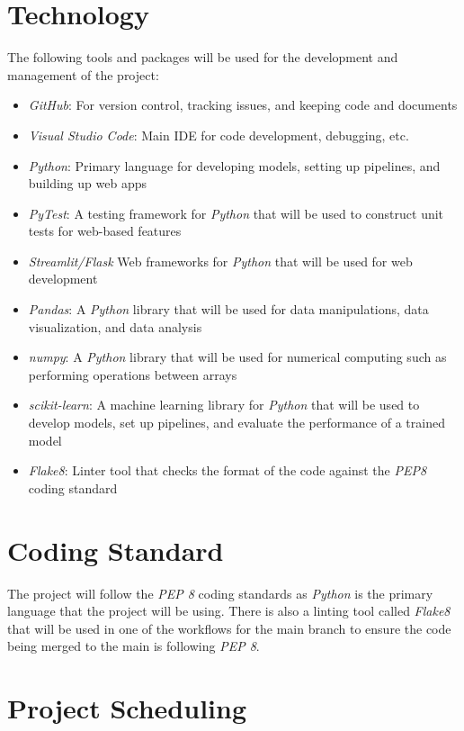 \documentclass{article}
\begin{document}
\section{Technology}
The following tools and packages will be used for the development and management of the project: 
\begin{itemize}
    \item \textit{GitHub}: For version control, tracking issues, and keeping code and documents
    \item \textit{Visual Studio Code}: Main IDE for code development, debugging,  etc.
    \item \textit{Python}: Primary language for developing models, setting up pipelines, and building up web apps
    \item \textit{PyTest}: A testing framework for \textit{Python} that will be used to construct unit tests for web-based features
    \item \textit{Streamlit/Flask} Web frameworks for \textit{Python} that will be used for web development
    \item \textit{Pandas}: A \textit{Python} library that will be used for data manipulations, data visualization, and data analysis
    \item \textit{numpy}: A \textit{Python} library that will be used for numerical computing such as performing operations between arrays
    \item \textit{scikit-learn}: A machine learning library for \textit{Python} that will be used to develop models, set up pipelines, and evaluate the performance of a trained model
    \item \textit{Flake8}: Linter tool that checks the format of the code against the \textit{PEP8} coding standard
\end{itemize}

\section{Coding Standard}
The project will follow the \textit{PEP 8} coding standards as \textit{Python} is the primary language that the project will be using. There is also a linting tool called \textit{Flake8}  that will be used in one of the workflows for the main branch to ensure the code being merged to the main is following \textit{PEP 8}.

\section{Project Scheduling}
\end{document}

